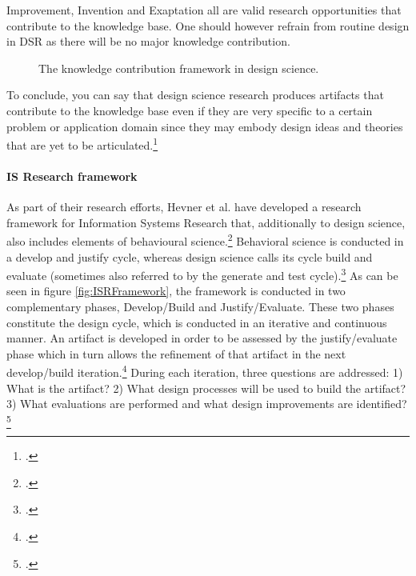 Improvement, Invention and Exaptation all are valid research opportunities that contribute to the knowledge base. One should however refrain from routine design in DSR as there will be no major knowledge contribution.

\begin{figure}
    \centering
    
    \caption[The knowledge contribution framework in design science.]{The knowledge contribution framework in design science.\footnotemark}
    \label{fig:DSRKnowledgeContribution}
\end{figure}

To conclude, you can say that design science research produces artifacts that contribute to the knowledge base even if they are very specific to a certain problem or application domain since they may embody design ideas and theories that are yet to be articulated.\footcite[Cf.][p.340]{GregorPositioningpresentingdesign2013}


\paragraph{IS Research framework}
As part of their research efforts, Hevner et al. have developed a research framework for Information Systems Research that, additionally to design science, also includes elements of behavioural science.\footcite[Cf.][p.80]{HevnerDesignScienceResearch2004} Behavioral science is conducted in a develop and justify cycle, whereas design science calls its cycle build and evaluate (sometimes also referred to by the generate and test cycle).\footcite[Cf.][p.80,89]{HevnerDesignScienceResearch2004}
As can be seen in figure \ref{fig:ISRFramework}, the framework is conducted in two complementary phases, Develop/Build and Justify/Evaluate. These two phases constitute the design cycle, which is conducted in an iterative and continuous manner. An artifact is developed in order to be assessed by the justify/evaluate phase which in turn allows the refinement of that artifact in the next develop/build iteration.\footcite[Cf.][p.19]{HevnerDesignResearchInformation2010} During each iteration, three questions are addressed: 1) What is the artifact? 2) What design processes will be used to build the artifact? 3) What evaluations are performed and what design improvements are identified?\footcite[Cf.][p.19]{HevnerDesignResearchInformation2010} \label{topic:design cycle}

